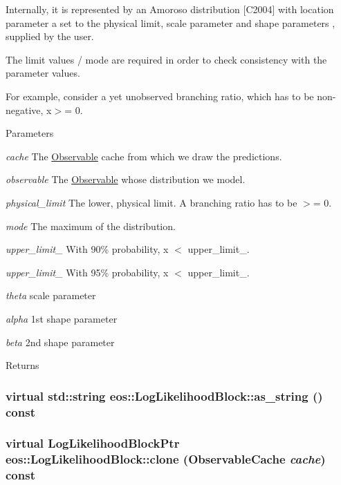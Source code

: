 Internally, it is represented by an Amoroso distribution \mbox{[}C2004\mbox{]} with location parameter a set to the physical limit, scale parameter  and shape parameters ,  supplied by the user.

The limit values / mode are required in order to check consistency with the parameter values.

For example, consider a yet unobserved branching ratio, which has to be non-\/negative, x$>$= 0.


\begin{DoxyParams}{Parameters}
\item[{\em cache}]The \hyperlink{classeos_1_1Observable}{Observable} cache from which we draw the predictions. \item[{\em observable}]The \hyperlink{classeos_1_1Observable}{Observable} whose distribution we model. \item[{\em physical\_\-limit}]The lower, physical limit. A branching ratio has to be $>$= 0. \item[{\em mode}]The maximum of the distribution. \item[{\em upper\_\-limit\_\-90}]With 90\% probability, x $<$ upper\_\-limit\_. \item[{\em upper\_\-limit\_\-95}]With 95\% probability, x $<$ upper\_\-limit\_. \item[{\em theta}]scale parameter \item[{\em alpha}]1st shape parameter \item[{\em beta}]2nd shape parameter \end{DoxyParams}
\begin{DoxyReturn}{Returns}

\end{DoxyReturn}
\hypertarget{classeos_1_1LogLikelihoodBlock_ad99b9336fdbb4c28eedc50b18d3c60c3}{
\subsubsection[{as\_\-string}]{\setlength{\rightskip}{0pt plus 5cm}virtual std::string eos::LogLikelihoodBlock::as\_\-string () const}}
\label{classeos_1_1LogLikelihoodBlock_ad99b9336fdbb4c28eedc50b18d3c60c3}
\hypertarget{classeos_1_1LogLikelihoodBlock_a950a255f78736f75b2458e48c30e119f}{
\subsubsection[{clone}]{\setlength{\rightskip}{0pt plus 5cm}virtual {\bf LogLikelihoodBlockPtr} eos::LogLikelihoodBlock::clone ({\bf ObservableCache} {\em cache}) const}}
\label{classeos_1_1LogLikelihoodBlock_a950a255f78736f75b2458e48c30e119f}


